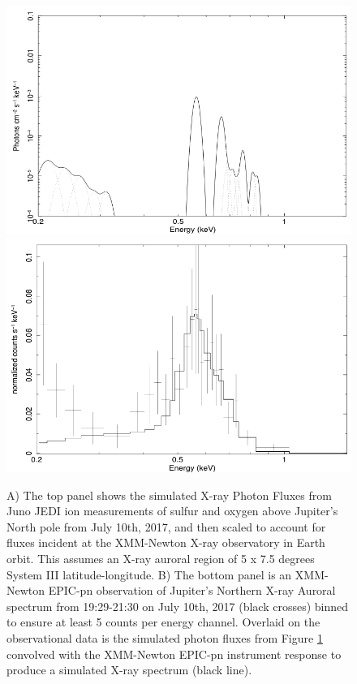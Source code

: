 \documentclass[draft]{agujournal2018}
\begin{document}
\begin{figure}
    \centering
    \includegraphics[width=\textwidth]{Figures/XraySpectrum.png}
    \includegraphics[width=\textwidth]{Figures/XMMNewtonComparison.png}
    \caption{A) The top panel shows the simulated X-ray Photon Fluxes from Juno JEDI ion measurements of sulfur and oxygen above Jupiter’s North pole from July 10th, 2017, and then scaled to account for fluxes incident at the XMM-Newton X-ray observatory in Earth orbit. This assumes an X-ray auroral region of 5 x 7.5 degrees System III latitude-longitude. B) The bottom panel is an XMM-Newton EPIC-pn observation of Jupiter’s Northern X-ray Auroral spectrum from 19:29-21:30 on July 10th, 2017 (black crosses) binned to ensure at least 5 counts per energy channel. Overlaid on the observational data is the simulated photon fluxes from Figure \ref{fig:XraySpectrumXMM} convolved with the XMM-Newton EPIC-pn instrument response to produce a simulated X-ray spectrum (black line).}
    \label{fig:XraySpectrumXMM}
\end{figure}
\end{document}
